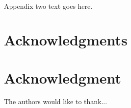 \documentclass[10pt,journal,compsoc]{IEEEtran}
\begin{document}
\section{}
Appendix two text goes here.


\ifCLASSOPTIONcompsoc
  \section*{Acknowledgments}
\else
  \section*{Acknowledgment}
\fi


The authors would like to thank...


\ifCLASSOPTIONcaptionsoff
  \newpage
\fi





%
%
%



% 
\end{document}

